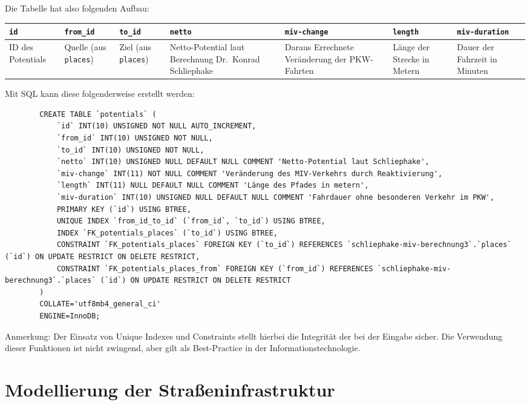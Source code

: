 \documentclass[fontsize=12pt,a4paper]{scrreprt}
\begin{document}
Die Tabelle hat also folgenden Aufbau:

\begin{table}[htbp]
    \begin{tabu}{|*7{X[l]|}}
        \hline
        \texttt{id} & \texttt{from_id} & \texttt{to_id} & \texttt{netto} & \texttt{miv-change} & \texttt{length} & \texttt{miv-duration}\\
        \hline
        ID des Potentials & Quelle (aus \texttt{places}) & Ziel (aus \texttt{places}) & Netto-Potential laut Berechnung Dr.\ Konrad Schliephake & Daraus Errechnete Veränderung der PKW-Fahrten & Länge der Strecke in Metern & Dauer der Fahrzeit in Minuten \\
        \hline
    \end{tabu}
\end{table}

Mit SQL kann diese folgenderweise erstellt werden:
\begingroup
    \begin{verbatim}
        CREATE TABLE `potentials` (
            `id` INT(10) UNSIGNED NOT NULL AUTO_INCREMENT,
            `from_id` INT(10) UNSIGNED NOT NULL,
            `to_id` INT(10) UNSIGNED NOT NULL,
            `netto` INT(10) UNSIGNED NULL DEFAULT NULL COMMENT 'Netto-Potential laut Schliephake',
            `miv-change` INT(11) NOT NULL COMMENT 'Veränderung des MIV-Verkehrs durch Reaktivierung',
            `length` INT(11) NULL DEFAULT NULL COMMENT 'Länge des Pfades in metern',
            `miv-duration` INT(10) UNSIGNED NULL DEFAULT NULL COMMENT 'Fahrdauer ohne besonderen Verkehr im PKW',
            PRIMARY KEY (`id`) USING BTREE,
            UNIQUE INDEX `from_id_to_id` (`from_id`, `to_id`) USING BTREE,
            INDEX `FK_potentials_places` (`to_id`) USING BTREE,
            CONSTRAINT `FK_potentials_places` FOREIGN KEY (`to_id`) REFERENCES `schliephake-miv-berechnung3`.`places` (`id`) ON UPDATE RESTRICT ON DELETE RESTRICT,
            CONSTRAINT `FK_potentials_places_from` FOREIGN KEY (`from_id`) REFERENCES `schliephake-miv-berechnung3`.`places` (`id`) ON UPDATE RESTRICT ON DELETE RESTRICT
        )
        COLLATE='utf8mb4_general_ci'
        ENGINE=InnoDB;
    \end{verbatim}
\endgroup
Anmerkung: Der Einsatz von Unique Indexes und Constraints stellt hierbei die Integrität der bei der Eingabe sicher. Die Verwendung dieser Funktionen ist nicht zwingend, aber gilt als Best-Practice in der Informationstechnologie.

\section{Modellierung der Straßeninfrastruktur}
\end{document}
